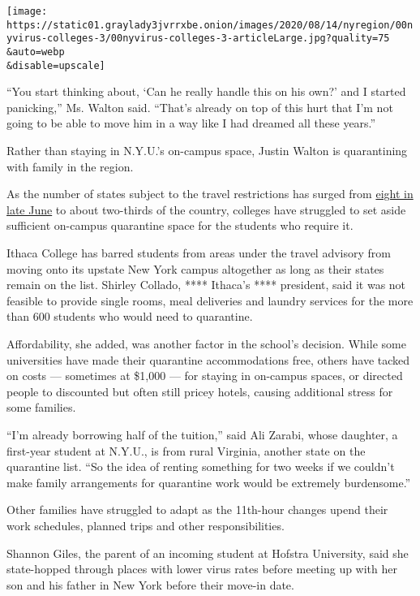 \texttt{[image: https://static01.graylady3jvrrxbe.onion/images/2020/08/14/nyregion/00nyvirus-colleges-3/00nyvirus-colleges-3-articleLarge.jpg?quality=75\\\&auto=webp\\\&disable=upscale]}

``You start thinking about, `Can he really handle this on his own?' and
I started panicking,'' Ms. Walton said. ``That's already on top of this
hurt that I'm not going to be able to move him in a way like I had
dreamed all these years.''

Rather than staying in N.Y.U.'s on-campus space, Justin Walton is
quarantining with family in the region.

As the number of states subject to the travel restrictions has surged
from
\href{https://www.nytimes3xbfgragh.onion/2020/06/24/nyregion/ny-coronavirus-states-quarantine.html}{eight
in late June} to about two-thirds of the country, colleges have
struggled to set aside sufficient on-campus quarantine space for the
students who require it.

Ithaca College has barred students from areas under the travel advisory
from moving onto its upstate New York campus altogether as long as their
states remain on the list. Shirley Collado, **** Ithaca's ****
president, said it was not feasible to provide single rooms, meal
deliveries and laundry services for the more than 600 students who would
need to quarantine.

Affordability, she added, was another factor in the school's decision.
While some universities have made their quarantine accommodations free,
others have tacked on costs --- sometimes at \$1,000 --- for staying in
on-campus spaces, or directed people to discounted but often still
pricey hotels, causing additional stress for some families.

``I'm already borrowing half of the tuition,'' said Ali Zarabi, whose
daughter, a first-year student at N.Y.U., is from rural Virginia,
another state on the quarantine list. ``So the idea of renting something
for two weeks if we couldn't make family arrangements for quarantine
work would be extremely burdensome.''

Other families have struggled to adapt as the 11th-hour changes upend
their work schedules, planned trips and other responsibilities.

Shannon Giles, the parent of an incoming student at Hofstra University,
said she state-hopped through places with lower virus rates before
meeting up with her son and his father in New York before their move-in
date.

